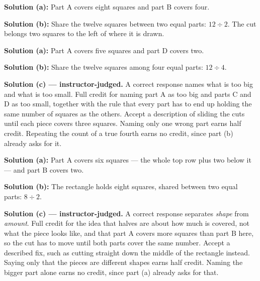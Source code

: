 \documentclass[12pt]{article}
\begin{document}
\textbf{Solution (a):} Part A covers eight squares and part B covers four. 

\textbf{Solution (b):} Share the twelve squares between two equal parts: $12 \div 2$. The cut belongs two squares to the left of where it is drawn. 


\textbf{Solution (a):} Part A covers five squares and part D covers two. 

\textbf{Solution (b):} Share the twelve squares among four equal parts: $12 \div 4$. 

\textbf{Solution (c) --- instructor-judged.} A correct response names what is too big and what is too small. Full credit for naming part A as too big and parts C and D as too small, together with the rule that every part has to end up holding the same number of squares as the others. Accept a description of sliding the cuts until each piece covers three squares. Naming only one wrong part earns half credit. Repeating the count of a true fourth earns no credit, since part (b) already asks for it.


\textbf{Solution (a):} Part A covers six squares --- the whole top row plus two below it --- and part B covers two. 

\textbf{Solution (b):} The rectangle holds eight squares, shared between two equal parts: $8 \div 2$. 

\textbf{Solution (c) --- instructor-judged.} A correct response separates \emph{shape} from \emph{amount}. Full credit for the idea that halves are about how much is covered, not what the piece looks like, and that part A covers more squares than part B here, so the cut has to move until both parts cover the same number. Accept a described fix, such as cutting straight down the middle of the rectangle instead. Saying only that the pieces are different shapes earns half credit. Naming the bigger part alone earns no credit, since part (a) already asks for that.
\end{document}
